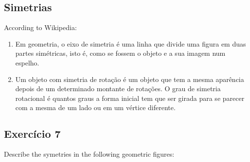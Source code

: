 \subsection*{Simetrias}

According to Wikipedia:

\begin{enumerate}
\item Em geometria, o eixo de simetria é uma linha que divide uma figura em
  duas partes simétricas, isto é, como se fossem o objeto e a sua imagem num
  espelho.
\item Um objeto com simetria de rotação é um objeto que tem a mesma aparência
  depois de um determinado montante de rotações.
  O grau de simetria rotacional é quantos graus a forma inicial
  tem que ser girada para se parecer com a mesma de um lado ou em um vértice
  diferente.
\end{enumerate}

\subsection*{Exercício 7}

Describe the symetries in the following geometric figures:

